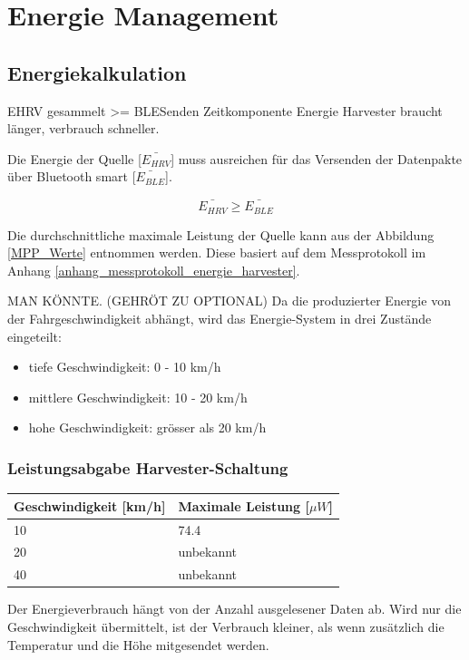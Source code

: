 \section{Energie Management}


\subsection{Energiekalkulation}
EHRV gesammelt >= BLESenden
Zeitkomponente
Energie Harvester braucht länger, verbrauch schneller.

Die Energie der Quelle [$\bar{E_{HRV}} $] muss ausreichen für das Versenden der Datenpakte über Bluetooth smart [$\bar{E_{BLE}}$].

\[\bar{E_{HRV}} \ge \bar{E_{BLE}}  \]


Die durchschnittliche maximale Leistung der Quelle kann aus der Abbildung \ref{MPP_Werte} entnommen werden. Diese basiert auf dem Messprotokoll im Anhang \ref{anhang_messprotokoll_energie_harvester}. 

MAN KÖNNTE. (GEHRÖT ZU OPTIONAL) Da die produzierter Energie von der Fahrgeschwindigkeit abhängt, wird das Energie-System in drei Zustände eingeteilt:

\begin{itemize}
    \item tiefe Geschwindigkeit: 0 - 10 km/h
    \item mittlere Geschwindigkeit: 10 - 20 km/h 
    \item hohe Geschwindigkeit: grösser als 20 km/h 
\end{itemize}



\subsubsection*{Leistungsabgabe Harvester-Schaltung}

\begin{tabular}{|l|l|}\hline \label{MPP_Werte} 
    Geschwindigkeit [km/h] & Maximale Leistung [$\mu W$] \\ \hline
    10 & 74.4 \\ \hline
    20 & unbekannt \\ \hline
    40 & unbekannt \\ \hline
\end{tabular}


Der Energieverbrauch hängt von der Anzahl ausgelesener Daten ab. Wird nur die Geschwindigkeit übermittelt, ist der Verbrauch kleiner, als wenn zusätzlich die Temperatur und die Höhe mitgesendet werden.

